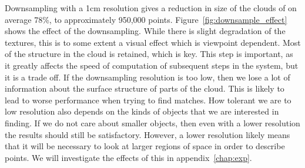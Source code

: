 \documentclass[11pt,a4paper]{kth-mag}
\begin{document}
Downsampling with a 1cm resolution gives a reduction in size of the clouds of on
average 78\%, to approximately 950,000 points.
Figure~\ref{fig:downsample_effect} shows the effect of the downsampling. While
there is slight degradation of the textures, this is to some extent a visual
effect which is viewpoint dependent. Most of the structure in the cloud is
retained, which is key. This step is important, as it greatly affects the speed
of computation of subsequent steps in the system, but it is a trade off. If the
downsampling resolution is too low, then we lose a lot of information about the
surface structure of parts of the cloud. This is likely to lead to worse
performance when trying to find matches. How tolerant we are to low resolution
also depends on the kinds of objects that we are interested in finding. If we do
not care about smaller objects, then even with a lower resolution the results
should still be satisfactory. However, a lower resolution likely means that it
will be necessary to look at larger regions of space in order to describe
points. We will investigate the effects of this in appendix~\ref{chap:exp}.
\end{document}
